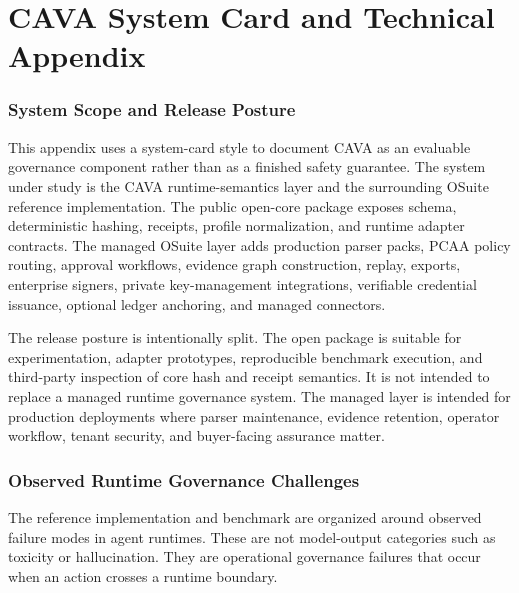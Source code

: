 \documentclass[11pt]{article}
\begin{document}
\appendix

\part{CAVA System Card and Technical Appendix}

\section{System Scope and Release Posture}

This appendix uses a system-card style to document CAVA as an evaluable governance component rather than as a finished safety guarantee. The system under study is the CAVA runtime-semantics layer and the surrounding OSuite reference implementation. The public open-core package exposes schema, deterministic hashing, receipts, profile normalization, and runtime adapter contracts. The managed OSuite layer adds production parser packs, PCAA policy routing, approval workflows, evidence graph construction, replay, exports, enterprise signers, private key-management integrations, verifiable credential issuance, optional ledger anchoring, and managed connectors.

The release posture is intentionally split. The open package is suitable for experimentation, adapter prototypes, reproducible benchmark execution, and third-party inspection of core hash and receipt semantics. It is not intended to replace a managed runtime governance system. The managed layer is intended for production deployments where parser maintenance, evidence retention, operator workflow, tenant security, and buyer-facing assurance matter.

\section{Observed Runtime Governance Challenges}

The reference implementation and benchmark are organized around observed failure modes in agent runtimes. These are not model-output categories such as toxicity or hallucination. They are operational governance failures that occur when an action crosses a runtime boundary.
\end{document}
